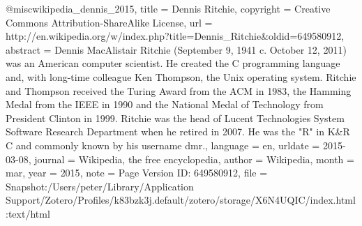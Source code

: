 {@misc{wikipedia_dennis_2015,
  title     = {Dennis {Ritchie}},
  copyright = {Creative Commons Attribution-ShareAlike License},
  url       = {http://en.wikipedia.org/w/index.php?title=Dennis_Ritchie&oldid=649580912},
  abstract  = {Dennis MacAlistair Ritchie (September 9, 1941 {\textendash} c. October 12, 2011) was an American computer scientist. He created the C programming language and, with long-time colleague Ken Thompson, the Unix operating system. Ritchie and Thompson received the Turing Award from the ACM in 1983, the Hamming Medal from the IEEE in 1990 and the National Medal of Technology from President Clinton in 1999. Ritchie was the head of Lucent Technologies System Software Research Department when he retired in 2007. He was the "R" in K\&R C and commonly known by his username dmr.},
  language  = {en},
  urldate   = {2015-03-08},
  journal   = {Wikipedia, the free encyclopedia},
  author    = {{Wikipedia}},
  month     = mar,
  year      = {2015},
  note      = {Page Version ID: 649580912},
  file      = {Snapshot:/Users/peter/Library/Application Support/Zotero/Profiles/k83bzk3j.default/zotero/storage/X6N4UQIC/index.html:text/html}
}

}
